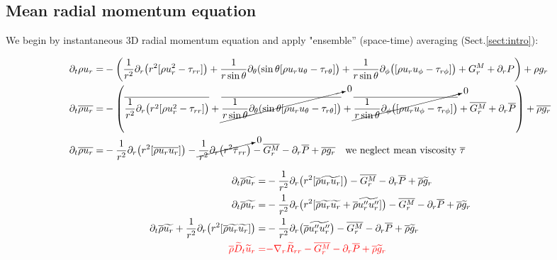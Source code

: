 \documentclass[10pt,paper=a4]{report}
\newcommand{\eht}{\overline}
\newcommand{\fht}{\widetilde}
\begin{document}
\fontsize{12pt}{20pt}

\subsection{Mean radial momentum equation}

We begin by instantaneous 3D radial momentum equation and apply "ensemble'' (space-time) averaging (Sect.\ref{sect:intro}):

\fontsize{9pt}{20pt}

\begin{align}
\partial_{t} \rho u_{r} = & -\left( \frac{1}{r^{2}} \partial_{r} \big( r^{2} [\rho u_{r}^{2} - \tau_{rr}]\big) + \frac{1}{r\sin{\theta}}\partial_{\theta}(\sin{\theta}[\rho u_{r} u_{\theta} - \tau_{r\theta}]\big) + \frac{1}{r\sin{\theta}}\partial_{\phi}\big([\rho u_{r} u_{\phi} - \tau_{r\phi}]\big) + G_r^M + \partial_{r} P \right) + \rho g_r \\
\partial_{t} \eht{\rho u_{r}}= & -\left( \eht{\frac{1}{r^{2}} \partial_{r} \big( r^{2} [\rho u_{r}^{2} - \tau_{rr}]\big)} + \cancelto{0}{\eht{\frac{1}{r\sin{\theta}}\partial_{\theta}(\sin{\theta}[\rho u_{r} u_{\theta} - \tau_{r\theta}]\big)}} + \cancelto{0}{\eht{\frac{1}{r\sin{\theta}}\partial_{\phi}\big([\rho u_{r} u_{\phi} - \tau_{r\phi}]\big)}} + \eht{G_r^M} + \partial_{r} \eht{P} \right) + \eht{\rho g_r} \\
\partial_{t} \eht{\rho {u}_{r}}= & -\frac{1}{r^{2}} \partial_{r} \big( r^{2} [\eht{\rho u_{r} u_{r}}] \big) - \cancelto{0}{\frac{1}{r^{2}} \partial_{r} \big(r^2 \eht{\tau}_{rr}\big)} - \eht{G_r^M} - \partial_{r} \eht{P} + \eht{\rho g_r} \ \ \ \mbox{we neglect mean viscosity $\eht{\tau}$} 
\end{align}

\newpage


\fontsize{9pt}{20pt}

\begin{align}
\partial_{t} \eht{\rho} \fht{u_{r}} = & -\frac{1}{r^{2}} \partial_{r} \big( r^{2} [\eht{\rho} \fht{u_{r} u_{r}}] \big) - \eht{G_r^M} - \partial_{r} \eht{P} + \eht{\rho} \fht{g}_r \\
\partial_{t} \eht{\rho} \fht{u_{r}} = & -\frac{1}{r^{2}} \partial_{r} \big( r^{2} [\eht{\rho} \fht{u_{r}} \fht{u_{r}} + \eht{\rho}\fht{u''_r u''_r}] \big) - \eht{G_r^M} - \partial_{r} \eht{P} + \eht{\rho} \fht{g}_r \\
\partial_{t} \eht{\rho} \fht{u_{r}} + \frac{1}{r^{2}} \partial_{r} \big( r^{2} [\eht{\rho} \fht{u_{r}} \fht{u_{r}}] \big) = & -\frac{1}{r^{2}} \partial_{r} \big( \eht{\rho}\fht{u''_r u''_r} \big) - \eht{G_r^M} - \partial_{r} \eht{P} + \eht{\rho} \fht{g}_r \\
{\color{red} \eht{\rho} \fht{D}_t \fht{u}_r = } & {\color{red}-\nabla_r \fht{R}_{rr}  - \eht{G_r^M} - \partial_{r} \eht{P} + \eht{\rho} \fht{g}_r}
\end{align}
\end{document}
